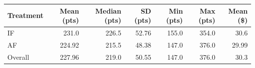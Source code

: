 \begin{tabular}{lrrrrrr}
  \toprule
  Treatment & Mean (pts) & Median (pts) & SD (pts) & Min (pts) & Max (pts) & Mean (\$) \\ 
  \midrule
  IF & 231.0 & 226.5 & 52.76 & 155.0 & 354.0 & 30.6 \\ 
  AF & 224.92 & 215.5 & 48.38 & 147.0 & 376.0 & 29.99 \\ 
  Overall & 227.96 & 219.0 & 50.55 & 147.0 & 376.0 & 30.3 \\ 
  \bottomrule
\end{tabular}

